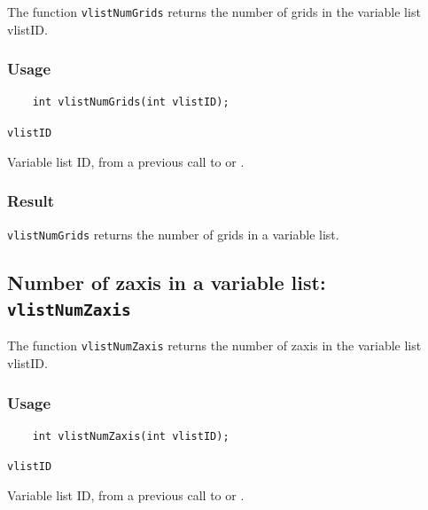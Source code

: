 The function {\texttt{vlistNumGrids}} returns the number of grids in the variable list vlistID.

\subsubsection*{Usage}

\begin{verbatim}
    int vlistNumGrids(int vlistID);
\end{verbatim}

\hspace*{4mm}\begin{minipage}[]{15cm}
\begin{deflist}{\texttt{vlistID}\ }
\item[\texttt{vlistID}]
Variable list ID, from a previous call to {} or {}.

\end{deflist}
\end{minipage}

\subsubsection*{Result}

{\texttt{vlistNumGrids}} returns the number of grids in a variable list.



\subsection{Number of zaxis in a variable list: \texttt{vlistNumZaxis}}
\label{vlistNumZaxis}

The function {\texttt{vlistNumZaxis}} returns the number of zaxis in the variable list vlistID.

\subsubsection*{Usage}

\begin{verbatim}
    int vlistNumZaxis(int vlistID);
\end{verbatim}

\hspace*{4mm}\begin{minipage}[]{15cm}
\begin{deflist}{\texttt{vlistID}\ }
\item[\texttt{vlistID}]
Variable list ID, from a previous call to {} or {}.

\end{deflist}
\end{minipage}

